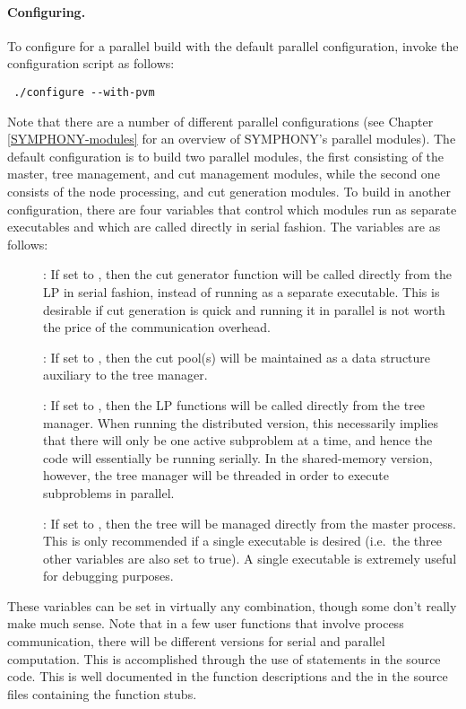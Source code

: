 \paragraph{Configuring.}

To configure for a parallel build with the default parallel configuration,
invoke the configuration script as follows: {\color{Brown}
\begin{verbatim}
 ./configure --with-pvm
\end{verbatim}
} 
Note that there are a number of different parallel configurations (see Chapter
\ref{SYMPHONY-modules} for an overview of SYMPHONY's parallel modules). The
default configuration is to build two parallel modules, the first consisting
of the master, tree management, and cut management modules, while the second
one consists of the node processing, and cut generation modules. To build in
another configuration, there are four variables that control which modules run
as separate executables and which are called directly in serial fashion. The
variables are as follows:
\begin{description}
        \item[] : If set to , then the cut generator
        function will be called directly from the LP in serial
        fashion, instead of running as a separate executable. This is
        desirable if cut generation is quick and running it in
        parallel is not worth the price of the communication overhead.
        \item[] : If set to , then the cut
        pool(s) will be maintained as a data structure auxiliary to the
        tree manager. 
        \item[] : If set to , then the LP
        functions will be called directly from the tree manager. When
        running the distributed version, this
        necessarily implies that there will only be one active
        subproblem at a time, and hence the code will essentially be
        running serially. In the shared-memory version, however, the
        tree manager will be threaded in order to execute subproblems 
        in parallel.
        \item[] : If set to , then the tree
        will be managed directly from the master process. This is only
        recommended if a single executable is desired (i.e.~the three
        other variables are also set to true). A single executable is
        extremely useful for debugging purposes.
\end{description}
These variables can be set in virtually any combination, though some
don't really make much sense. Note that in a few user functions that
involve process communication, there will be different versions for
serial and parallel computation. This is accomplished through the use
of  statements in the source code. This is well documented
in the function descriptions and the in the source files containing
the function stubs.

